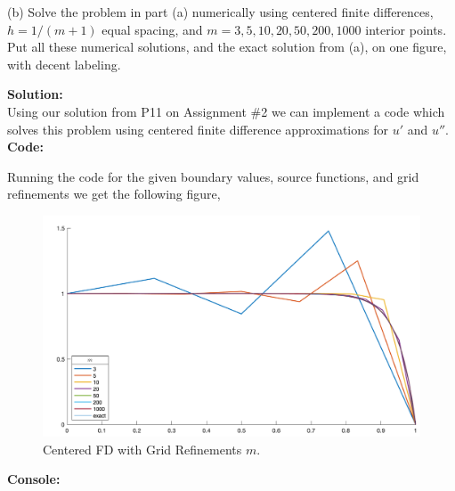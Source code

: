 \documentclass[12pt]{article}
\makeatletter
\theoremstyle{homework}
\newenvironment{exercise}[1]
{\def\@currentlabel{#1}\exercisecore}
{\endexercisecore}
\newcommand{\localhead}[1]{\par\smallskip\noindent\textbf{#1}\nobreak\\}%
\newcommand\solution{\localhead{Solution:}}
\makeatother
\begin{document}
\begin{exercise}{Problem P20}
  \item[(b)] Solve the problem in part (a) numerically using centered finite differences, $h = 1/(m + 1)$ equal spacing, 
  and $m = 3, 5, 10, 20, 50, 200, 1000$ interior points. Put all these numerical solutions, and the exact solution from (a), 
  on one figure, with decent labeling. 
  \solution Using our solution from P11 on Assignment \#2 we can implement a code which solves this problem using centered finite 
  difference approximations for $u'$ and $u''$. \\
  
  \textbf{Code:}
  \begin{center}
    
  \end{center}

  Running the code for the given boundary values, source functions, and grid refinements we get the following figure, 
   
  \begin{figure}[H]
    \begin{center}
      \caption{Centered FD with Grid Refinements $m$. }
      \includegraphics[width=\textwidth]{figP20.png}
    \end{center}
  \end{figure}
  
  
  \textbf{Console:}
  \begin{center}
    
  \end{center}


\end{exercise}
\end{document}
